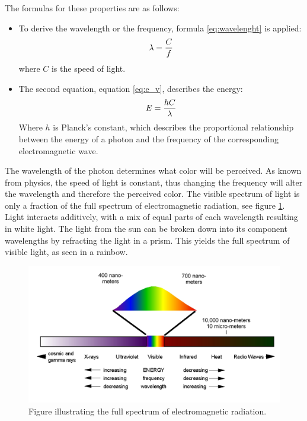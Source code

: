 The formulas for these properties are as follows:
\begin{itemize}
\item To derive the wavelength or the frequency, formula \ref{eq:wavelenght} is applied:
\begin{align}
\centering 
\lambda = \frac{C}{f}
\label{eq:wavelenght} 
\end{align}
where {$C$} is the speed of light.
\item The second equation, equation \ref{eq:e_v}, describes the energy:
\begin{align}
\centering
E = \frac{hC}{\lambda}
\label{eq:e_v} 
\end{align}
Where {$h$} is Planck's constant, which describes the proportional relationship between the energy of a photon and the frequency of the corresponding electromagnetic wave.
\end{itemize}

The wavelength of the photon determines what color will be perceived. As known from physics, the speed of light is constant, thus changing the frequency will alter the wavelength and therefore the perceived color. The visible spectrum of light is only a fraction of the full spectrum of electromagnetic radiation, see figure \ref{fig:em_rad}. Light interacts additively, with a mix of equal parts of each wavelength resulting in white light. The light from the sun can be broken down into its component wavelengths by refracting the light in a prism. This yields the full spectrum of visible light, as seen in a rainbow.

\begin{figure}[htbp] 
\centering 
\includegraphics[width=1\textwidth]{Pictures/Theory/em_rad.png} 
\caption{Figure illustrating the full spectrum of electromagnetic radiation.} 
\label{fig:em_rad} 
\end{figure}

